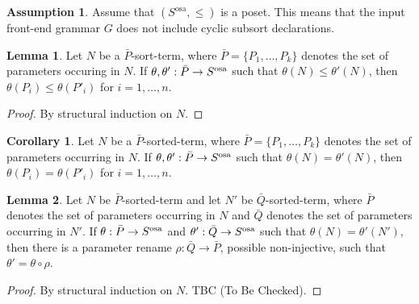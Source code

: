 \documentclass{article}
\theoremstyle{definition}
\theoremstyle{definition}
\newtheorem{assumption}{Assumption}[section]
\theoremstyle{definition}
\theoremstyle{definition}
\theoremstyle{definition}
\theoremstyle{theorem}
\theoremstyle{theorem}
\theoremstyle{theorem}
\newtheorem{lemma}{Lemma}[section]
\theoremstyle{theorem}
\theoremstyle{theorem}
\newtheorem{corollary}{Corollary}[section]
\begin{document}
{\begin{assumption}
Assume that $(S^\textrm{osa},\le)$ is a poset. This means that the input front-end grammar $G$ does not include cyclic subsort declarations.
\end{assumption}

\begin{lemma}\label{lem:leqinst}
Let $N$ be a $\bar{P}$-sort-term, where $\bar{P}=\{P_1,\ldots,P_k\}$ denotes the set of parameters occuring in $N$. If $\theta,\theta':\bar{P}\to S^{\rm osa}$ such that $\theta(N)\le\theta'(N)$, then $\theta(P_i)\le \theta(P'_i)$ for $i=1,\ldots,n$.
\end{lemma}
\begin{proof}
By structural induction on $N$.
\end{proof}
\begin{corollary}
Let $N$ be a $\bar{P}$-sorted-term, where $\bar{P}=\{P_1,\ldots,P_k\}$ denotes the set of parameters occurring in $N$. If $\theta,\theta':\bar{P}\to S^{\rm osa}$ such that $\theta(N) = \theta'(N)$, then $\theta(P_i) = \theta(P'_i)$ for $i=1,\ldots,n$. 
\end{corollary}


\begin{lemma}\label{lem:renaming}
Let $N$ be $\bar{P}$-sorted-term and let $N'$ be $\bar{Q}$-sorted-term, where $\bar{P}$ denotes the set of parameters occurring in $N$ and $\bar{Q}$ denotes the set of parameters occurring in $N'$. 
If $\theta:\bar{P}\to S^{\rm osa}$ and $\theta':\bar{Q}\to S^{\rm osa}$  such that $\theta(N) = \theta'(N')$, then there is a parameter rename $\rho:\bar{Q}\to \bar{P}$, possible non-injective, such that $\theta'=\theta\circ \rho$.
\end{lemma}
\begin{proof}
By structural induction on $N$. TBC (To Be Checked).
\end{proof}


}
\end{document}
